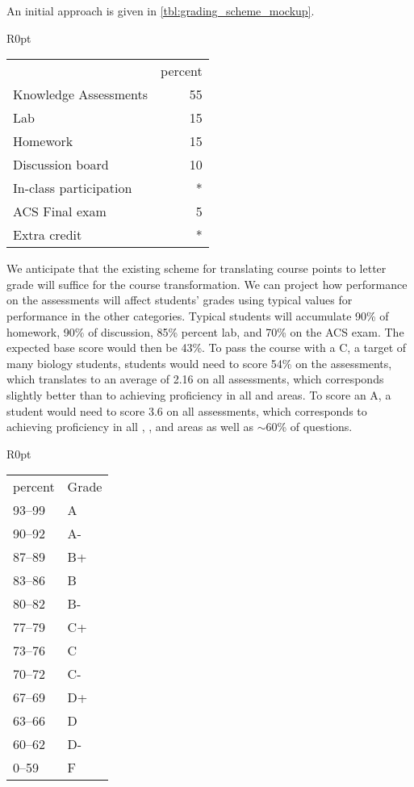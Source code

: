 \documentclass[10pt,letterpaper]{article}
\begin{document}
An initial approach is given in \cref{tbl:grading_scheme_mockup}.
\begin{wraptable}{R}{0pt}
\begin{tabular}{lr}
&percent\\
Knowledge Assessments & 55\\
Lab  & 15\\
Homework  & 15\\
Discussion board  & 10\\
In-class participation  & *\\ 
ACS Final exam  & 5\\
Extra credit  & *
\end{tabular}
\caption{\label{tbl:grading_scheme_mockup}
The revised point structure will be quite similar to the existing point distribution.} 
\end{wraptable}

We anticipate that the existing scheme for translating course points to letter grade will suffice for the course transformation. We can project how performance on the assessments will affect students' grades using typical values for performance in the other categories. Typical students will accumulate 90\% of homework, 90\% of discussion, 85\% percent lab, and 70\% on the ACS exam. The expected base score would then be 43\%. To pass the course with a C, a target of many biology students, students would need to score  54\% on the assessments, which translates to an average of 2.16 on all assessments, which corresponds slightly better than to achieving proficiency in all \recall and \comprehension areas. To score an A, a student would need to score 3.6 on all assessments, which corresponds to achieving proficiency in all \recall, \comprehension, and \analysis areas as well as $\sim60$\% of \use questions. 

\begin{wraptable}{R}{0pt}
\begin{tabular}{ll}
percent&Grade\\
93--99&A\\
90--92&A-\\
87--89&B+\\
83--86&B\\
80--82&B-\\
77--79&C+\\
73--76&C\\
70--72&C-\\
67--69&D+\\
63--66&D\\
60--62&D-\\
0--59&F
\end{tabular}
\caption{\label{tbl:points}
We anticipate that the scoring structure will remain unchanged.} 
\end{wraptable}
\end{document}
